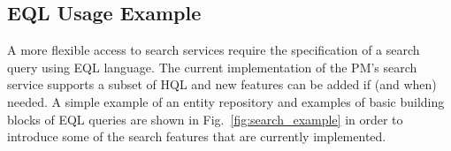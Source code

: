 %
%


\subsection{EQL Usage Example}

A more flexible access to search services require the specification of a search query using EQL language. The current implementation of the PM's search service supports a subset of HQL and new features can be added if (and when) needed. A simple example of an entity repository and examples of basic building blocks of EQL queries are shown in Fig.~\ref{fig:search_example} in order to introduce some of the search features that are currently implemented. 

